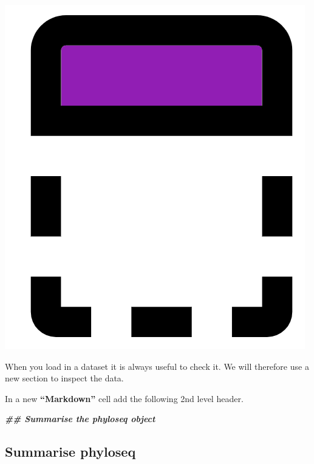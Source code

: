 \documentclass[
]{book}
\newenvironment{Shaded}{\begin{snugshade}}{\end{snugshade}}
\newcommand{\DocumentationTok}[1]{\textcolor[rgb]{0.56,0.35,0.01}{\textbf{\textit{#1}}}}
\begin{document}
\includegraphics{figures/header.png}

When you load in a dataset it is always useful to check it.
We will therefore use a new section to inspect the data.

In a new \textbf{``Markdown''} cell add the following 2nd level header.

\begin{Shaded}
\begin{Highlighting}[]
\DocumentationTok{\#\# Summarise the phyloseq object}
\end{Highlighting}
\end{Shaded}

\hypertarget{summarise-phyloseq}{%
\subsection{Summarise phyloseq}\label{summarise-phyloseq}}
\end{document}
